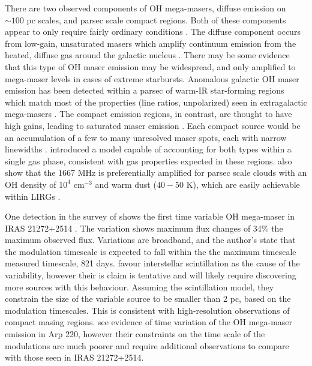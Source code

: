 There are two observed components of OH mega-masers, diffuse emission on $\sim 100$ pc scales, and parsec scale compact regions. Both of these components appear to only require fairly ordinary conditions \citep{lo2005}. The diffuse component occurs from low-gain, unsaturated masers which amplify continuum emission from the heated, diffuse gas around the galactic nucleus \citep[e.g.]{Baan_1985}. There may be some evidence that this type of OH maser emission may be widespread, and only amplified to mega-maser levels in cases of extreme starbursts. Anomalous galactic OH maser emission has been detected within a parsec of warm-IR star-forming regions which match most of the properties (line ratios, unpolarized) seen in extragalactic mega-masers \cite{Mirabel_1989}.  The compact emission regions, in contrast, are thought to have high gains, leading to saturated maser emission \citep[e.g.,]{lonsdale2002}. Each compact source would be an accumulation of a few to many unresolved maser spots, each with narrow linewidths \citet{lo2005}.  \citet{Parra_2005} introduced a model capable of accounting for both types within a single gas phase, consistent with gas properties expected in these regions. \citet{randell1995} also show that the 1667 MHz is preferentially amplified for parsec scale clouds with an OH density of $10^4$ cm$^{-3}$ and warm dust ($40-50$ K), which are easily achievable within LIRGs \citep{lo2005}.

One detection in the survey of \citet{darling2002_paperIII} shows the first time variable OH mega-maser in IRAS 21272+2514 \citep[$z\sim 0.15$]{darling2002_timevar}. The variation shows maximum flux changes of 34\% the maximum observed flux. Variations are broadband, and the author's state that the modulation timescale is expected to fall within the the maximum timescale measured timescale, 821 days. \citet{darling2002_timevar} favour interstellar scintillation as the cause of the variability, however their is claim is tentative and will likely require discovering more sources with this behaviour. Assuming the scintillation model, they constrain the size of the variable source to be smaller than 2 pc, based on the modulation timescales. This is consistent with high-resolution observations of compact masing regions. \citet{Lonsdale_2007} see evidence of time variation of the OH mega-maser emission in Arp 220, however their constraints on the time scale of the modulations are much poorer and require additional observations to compare with those seen in IRAS 21272+2514.


